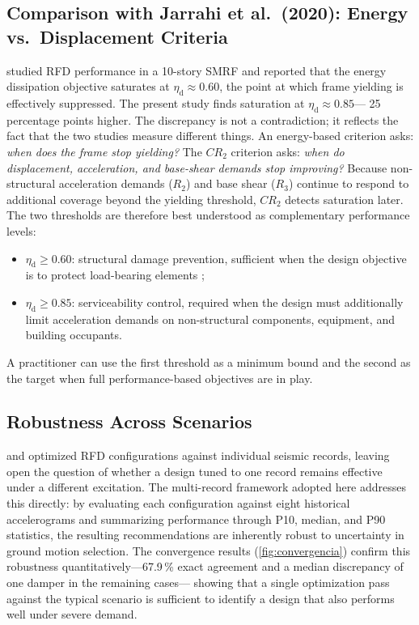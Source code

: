 \documentclass[preprint,12pt,authoryear]{elsarticle}
\newcommand{\etad}{\eta_{\mathrm{d}}}
\begin{document}
\subsection{Comparison with Jarrahi et al.\ (2020): Energy vs.\ Displacement Criteria}

\citet{Jarrahi2020sdee} studied RFD performance in a 10-story SMRF and
reported that the energy dissipation objective saturates at
$\etad \approx 0.60$, the point at which frame yielding is effectively
suppressed. The present study finds saturation at $\etad \approx 0.85$---
25 percentage points higher. The discrepancy is not a contradiction; it
reflects the fact that the two studies measure different things. An
energy-based criterion asks: \emph{when does the frame stop yielding?}
The $CR_2$ criterion asks: \emph{when do displacement, acceleration, and
base-shear demands stop improving?} Because non-structural acceleration
demands ($R_2$) and base shear ($R_3$) continue to respond to additional
coverage beyond the yielding threshold, $CR_2$ detects saturation later.
The two thresholds are therefore best understood as complementary performance
levels:
\begin{itemize}
    \item $\etad \geq 0.60$: structural damage prevention, sufficient when
          the design objective is to protect load-bearing elements
          \citep{Jarrahi2020sdee};
    \item $\etad \geq 0.85$: serviceability control, required when the
          design must additionally limit acceleration demands on non-structural
          components, equipment, and building occupants.
\end{itemize}
A practitioner can use the first threshold as a minimum bound and the second
as the target when full performance-based objectives are in play.

\subsection{Robustness Across Scenarios}

\citet{Jarrahi2020jbe} and \citet{Jarrahi2020sdee} optimized RFD
configurations against individual seismic records, leaving open the question
of whether a design tuned to one record remains effective under a different
excitation. The multi-record framework adopted here addresses this directly:
by evaluating each configuration against eight historical accelerograms and
summarizing performance through P10, median, and P90 statistics, the
resulting recommendations are inherently robust to uncertainty in ground
motion selection. The convergence results (\cref{fig:convergencia}) confirm
this robustness quantitatively---67.9\,\% exact agreement and a median
discrepancy of one damper in the remaining cases---
showing that a single optimization pass against the typical scenario is
sufficient to identify a design that also performs well under severe demand.
\end{document}
